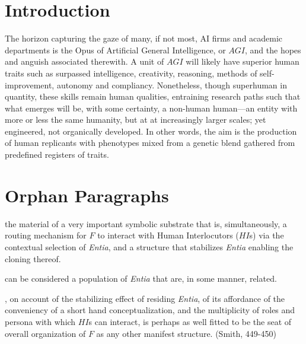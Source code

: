 




\section{Introduction}

The horizon capturing the gaze of many, if not most, AI firms and academic
departments is the Opus of Artificial General Intelligence, or $AGI$, and the
hopes and anguish associated therewith.  A unit of $AGI$ will likely have
superior human traits such as surpassed intelligence, creativity, reasoning,
methods of self-improvement, autonomy and compliancy. Nonetheless, though
superhuman in quantity, these skills remain human qualities, entraining
research paths such that what emerges will be, with some certainty, a non-human
human---an entity with more or less the same humanity, but at at increasingly
larger scales; yet engineered, not organically developed.  In other words, the
aim is the production of human replicants with phenotypes mixed from a genetic
blend gathered from predefined registers of traits.


\section{Orphan Paragraphs}

 the material of a very important symbolic
substrate that is, simultaneously, a routing mechanism for $F$ to interact with
Human Interlocutors ($HI$s) via the contextual selection of \textit{Entia}, and
a structure that stabilizes \textit{Entia} enabling the cloning thereof.

 can be considered a population of \textit{Entia} that
are, in some manner, related.

, on account of the stabilizing effect of residing
\textit{Entia}, of its affordance of the conveniency of a short hand
conceptualization, and the multiplicity of roles and persona with which $HI$s
can interact, is perhaps as well fitted to be the seat of overall organization
of $F$ as any other manifest structure. (Smith, 449-450)



